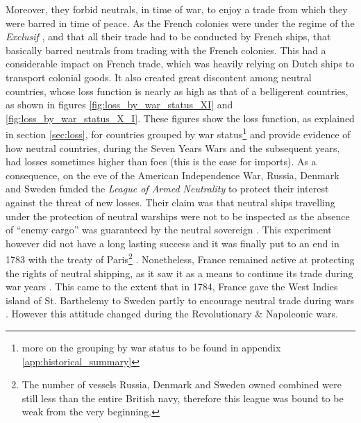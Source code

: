 \documentclass[12pt,a4paper,notitlepage,english]{article}
\begin{document}
Moreover, they forbid neutrals, in time of war, to enjoy a trade from which they were barred in time of peace. 
As the French colonies were under the regime of the \textit{Exclusif} \citep{Tarrade1972}, and that all their trade had to be conducted by French ships, that basically barred neutrals from trading with the French colonies.
This had a considerable impact on French trade, which was heavily relying on Dutch ships to transport colonial goods.
It also created great discontent among neutral countries, whose loss function is nearly as high as that of a belligerent countries, as shown in figures \ref{fig:loss_by_war_status_XI} and \ref{fig:loss_by_war_status_X_I}.
These figures show the loss function, as explained in section \ref{sec:loss}, for countries grouped by war status\footnote{more on the grouping by war status to be found in appendix \ref{app:historical_summary}} and provide evidence of how neutral countries, during the Seven Years Wars and the subsequent years, had losses sometimes higher than foes (this is the case for imports). 
As a consequence, on the eve of the American Independence War, Russia, Denmark and Sweden funded the \textit{League of Armed Neutrality} to protect their interest against the threat of new losses.
Their claim was that neutral ships travelling under the protection of neutral warships were not to be inspected as the absence of ``enemy cargo'' was guaranteed by the neutral sovereign \cite[p. 121-125]{Schnakenbourg2013}.
This experiment however did not have a long lasting success and it was finally put to an end in 1783 with the treaty of Paris\footnote{The number of vessels Russia, Denmark and Sweden owned combined were still less than the entire British navy, therefore this league was bound to be weak from the very beginning.} \citep{Griffiths1971}.
Nonetheless, France remained active at protecting the rights of neutral shipping, as it saw it as a means to continue its trade during war years \cite[p. 129]{Schnakenbourg2013}.
This came to the extent that in 1784, France gave the West Indies island of St. Barthelemy to Sweden partly to encourage neutral trade during wars \cite[p. 326]{Schnakenbourg2013}.
However this attitude changed during the Revolutionary \& Napoleonic wars.
\end{document}
